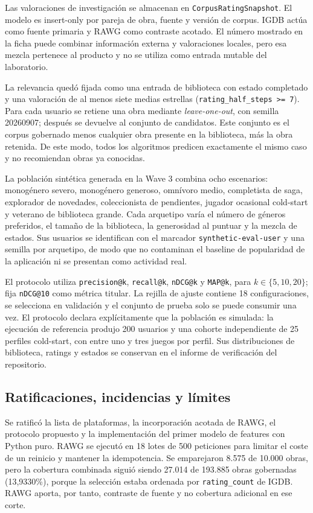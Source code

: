 Las valoraciones de investigación se almacenan en
\texttt{CorpusRatingSnapshot}. El modelo es insert-only por pareja de obra, fuente y versión
de corpus. IGDB actúa como fuente primaria y RAWG como contraste acotado. El número mostrado
en la ficha puede combinar información externa y valoraciones locales, pero esa mezcla
pertenece al producto y no se utiliza como entrada mutable del laboratorio.

La relevancia quedó fijada como una entrada de biblioteca con estado completado y una
valoración de al menos siete medias estrellas
(\texttt{rating\_half\_steps >= 7}). Para cada usuario se retiene una obra mediante
\textit{leave-one-out}, con semilla 20260907; después se devuelve al conjunto de candidatos. Este
conjunto es el corpus gobernado menos cualquier obra presente en la biblioteca, más la obra
retenida. De este modo, todos los algoritmos predicen exactamente el mismo caso y no
recomiendan obras ya conocidas.

La población sintética generada en la Wave 3 combina ocho escenarios: monogénero severo,
monogénero generoso, omnívoro medio, completista de saga, explorador de novedades,
coleccionista de pendientes, jugador ocasional cold-start y veterano de biblioteca grande.
Cada arquetipo varía el número de géneros preferidos, el tamaño de la biblioteca, la
generosidad al puntuar y la mezcla de estados. Sus usuarios se identifican con el marcador
\texttt{synthetic-eval-user} y una semilla por arquetipo, de modo que no contaminan el
baseline de popularidad de la aplicación ni se presentan como actividad real.

El protocolo utiliza \texttt{precision@k}, \texttt{recall@k}, \texttt{nDCG@k} y
\texttt{MAP@k}, para $k\in\{5,10,20\}$; fija \texttt{nDCG@10} como métrica titular. La
rejilla de ajuste contiene 18 configuraciones, se selecciona en validación y el conjunto de
prueba solo se puede consumir una vez. El protocolo declara explícitamente que la población
es simulada: la ejecución de referencia produjo 200 usuarios y una cohorte independiente
de 25 perfiles cold-start, con entre uno y tres juegos por perfil. Sus distribuciones de
biblioteca, ratings y estados se conservan en el informe de verificación del repositorio.

\subsection{Ratificaciones, incidencias y límites}

Se ratificó la lista de plataformas, la incorporación acotada de RAWG, el protocolo
propuesto y la implementación del primer modelo de features con Python puro. RAWG se ejecutó
en 18 lotes de 500 peticiones para limitar el coste de un reinicio y mantener la idempotencia.
Se emparejaron 8.575 de 10.000 obras, pero la cobertura combinada siguió siendo 27.014 de
193.885 obras gobernadas (13,9330\%), porque la selección estaba ordenada por
\texttt{rating\_count} de IGDB. RAWG aporta, por tanto, contraste de fuente y no cobertura
adicional en ese corte.

